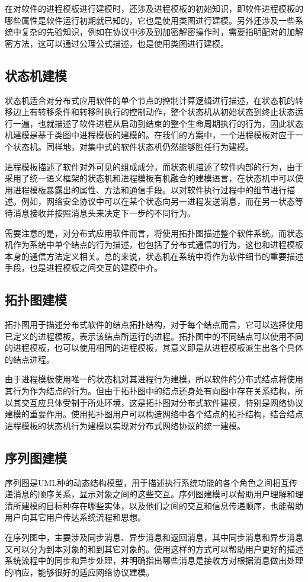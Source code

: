 在对软件的进程模板进行建模时，还涉及进程模板的初始知识，即软件进程模板的哪些属性是软件运行初期就已知的，它也是使用类图进行建模。另外还涉及一些系统中复杂的先验知识，例如在协议中涉及到加密解密操作时，需要指明配对的加解密方法，这可以通过公理公式描述，也是使用类图进行建模。

\subsection{状态机建模}
状态机适合对分布式应用软件的单个节点的控制计算逻辑进行描述，在状态机的转移边上有转移条件和转移时执行的控制动作，整个状态机从初始状态到终止状态运行一遍，也就描述了软件进程从启动到结束的整个生命周期执行的行为，因此状态机建模是基于类图中进程模板的建模的。在我们的方案中，一个进程模板对应于一个状态机。同样地，对集中式的软件状态机仍然能够胜任行为建模。
\par
进程模板描述了软件对外可见的组成成分，而状态机描述了软件内部的行为，由于采用了统一语义框架的状态机和进程模板有机融合的建模语言，在状态机中可以使用进程模板暴露出的属性、方法和通信手段。以对软件执行过程中的细节进行描述。例如，网络安全协议中可以在某个状态向另一进程发送消息，而在另一状态等待消息接收并按照消息头来决定下一步的不同行为。
\par
需要注意的是，对分布式应用软件而言，将使用拓扑图描述整个软件系统。而状态机作为系统中单个结点的行为描述，也包括了分布式通信的行为，这也和进程模板本身的通信方法定义相关。总的来说，状态机在系统中将作为软件细节的重要描述手段，也是进程模板之间交互的建模中介。

\subsection{拓扑图建模}
拓扑图用于描述分布式软件的结点拓扑结构，对于每个结点而言，它可以选择使用已定义的进程模板，表示该结点所运行的进程。拓扑图中的不同结点可以使用不同的进程模板，也可以使用相同的进程模板，其意义即是从进程模板派生出各个具体的结点进程。
\par
由于进程模板使用唯一的状态机对其进程行为建模，所以软件的分布式结点将使用其行为作为结点的行为。但由于拓扑图中的结点还身处有向图中存在关系结构，所以其交互应具体受制于所处环境，这是拓扑图对分布式软件建模，特别是网络协议建模的重要作用。使用拓扑图用户可以构造网络中各个结点的拓扑结构，结合结点进程模板的状态机行为建模以实现对分布式网络协议的统一建模。

\subsection{序列图建模}
序列图是UML种的动态结构模型，用于描述执行系统功能的各个角色之间相互传递消息的顺序关系，显示对象之间的这些交互。序列图建模可以帮助用户理解和理清所建模的目标种存在哪些实体，以及他们之间的交互和信息传递顺序，也能帮助用户向其它用户传达系统流程和思想。
\par
在序列图中，主要涉及同步消息、异步消息和返回消息，其中同步消息和异步消息又可以分为到本对象的和到其它对象的。使用这样的方式可以帮助用户更好的描述系统流程中的同步和异步处理，并明确指出哪些消息是接收方对根据消息做出处理的响应，能够很好的适应网络协议建模。


